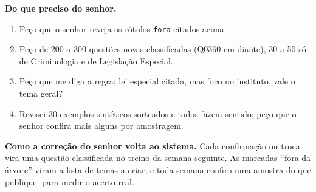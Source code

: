 \documentclass[12pt]{article}
\newcommand{\cod}[1]{\texttt{\small #1}}
\begin{document}
\textbf{Do que preciso do senhor.}
\begin{enumerate}
\item Peço que o senhor reveja os rótulos \cod{fora} citados acima.
\item Peço de 200 a 300 questões novas classificadas (Q0360 em diante), 30 a 50 só de Criminologia e de Legislação Especial.
\item Peço que me diga a regra: lei especial citada, mas foco no instituto, vale o tema geral?
\item Revisei 30 exemplos sintéticos sorteados e todos fazem sentido; peço que o senhor confira mais alguns por amostragem.
\end{enumerate}

\textbf{Como a correção do senhor volta ao sistema.} Cada confirmação ou troca vira uma questão classificada no treino da semana seguinte. As marcadas ``fora da árvore'' viram a lista de temas a criar, e toda semana confiro uma amostra do que publiquei para medir o acerto real.
\end{document}
